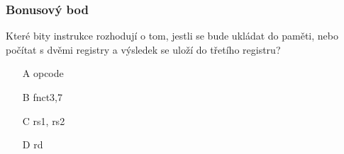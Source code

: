 \documentclass{beamer}
\begin{document}
\begin{frame}
\frametitle{Bonusový bod}

Které bity instrukce rozhodují o tom, jestli se bude ukládat do paměti, nebo počítat s dvěmi registry a výsledek se uloží do třetího registru?
\begin{itemize}
\item[A] opcode
\item[B] fnct3,7
\item[C] rs1, rs2
\item[D] rd
\end{itemize}
\end{frame}
\end{document}
